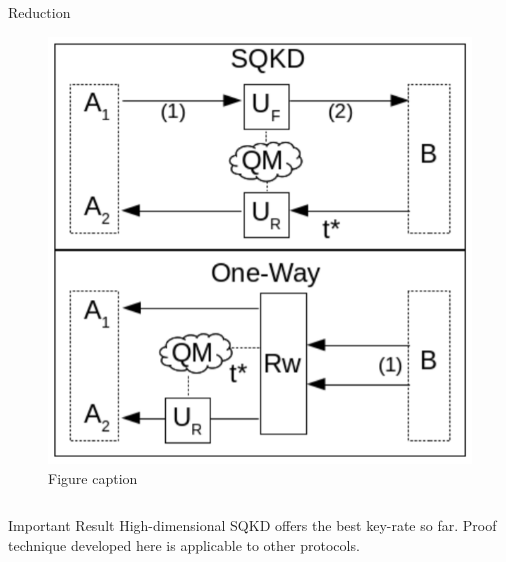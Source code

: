 \documentclass[final]{beamer}
\newlength{\onecolwid}
\newlength{\twocolwid}
\begin{document}
\begin{frame}[t]
\begin{columns}[t]
\begin{column}{\twocolwid}
\begin{columns}[t,totalwidth=\twocolwid]
\begin{column}{\onecolwid}
\begin{block}{Reduction}
\begin{figure}
	\includegraphics[width=0.8\linewidth]{oneway.png}
	\caption{Figure caption}
\end{figure}


\end{block}


\end{column} %

\end{columns} %


\begin{alertblock}{Important Result}
High-dimensional SQKD offers the best key-rate so far. Proof technique developed here is applicable to other protocols.
\end{alertblock} 


\begin{columns}[t,totalwidth=\twocolwid] %


\end{columns}
\end{column}
\end{columns}
\end{frame}
\end{document}
